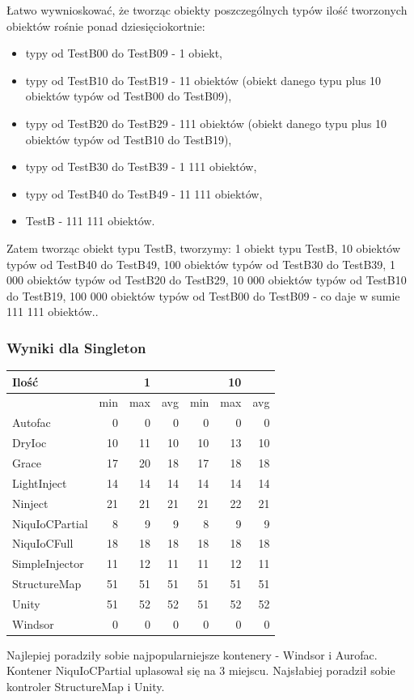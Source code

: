 \documentclass[12pt]{article}
\begin{document}
Łatwo wywnioskować, że tworząc obiekty poszczególnych typów ilość tworzonych obiektów rośnie ponad dziesięciokortnie:
\begin{itemize}
	\item typy od TestB00 do TestB09 - 1 obiekt,
	\item typy od TestB10 do TestB19 - 11 obiektów (obiekt danego typu plus 10 obiektów typów od TestB00 do TestB09),
	\item typy od TestB20 do TestB29 - 111 obiektów (obiekt danego typu plus 10 obiektów typów od TestB10 do TestB19),
	\item typy od TestB30 do TestB39 - 1 111 obiektów,
	\item  typy od TestB40 do TestB49 - 11 111 obiektów,
	\item TestB - 111 111 obiektów.
\end{itemize}
Zatem tworząc obiekt typu TestB, tworzymy: 1 obiekt typu TestB, 10 obiektów typów od TestB40 do TestB49, 100 obiektów typów od TestB30 do TestB39, 1 000 obiektów typów od TestB20 do TestB29, 10 000 obiektów typów od TestB10 do TestB19, 100 000 obiektów typów od TestB00 do TestB09 - co daje w sumie 111 111 obiektów..

\subsubsection{Wyniki dla Singleton}
\begin{center}
\begin{small}
	\begin{tabular}{ | l | r r r | r r r | }
    		\hline
     		Ilość & & 1 & & & 10 &  \\ \hline
     		 & min & max & avg & min & max & avg \\ \hline
		Autofac & 0 & 0 & 0 & 0 & 0 & 0 \\ \hline
		DryIoc & 10 & 11 & 10 & 10 & 13 & 10 \\ \hline
		Grace & 17 & 20 & 18 & 17 & 18 & 18 \\ \hline
		LightInject & 14 & 14 & 14 & 14 & 14 & 14 \\ \hline
		Ninject & 21 & 21 & 21 & 21 & 22 & 21 \\ \hline
		NiquIoCPartial & 8 & 9 & 9 & 8 & 9 & 9 \\ \hline
		NiquIoCFull & 18 & 18 & 18 & 18 & 18 & 18 \\ \hline
		SimpleInjector & 11 & 12 & 11 & 11 & 12 & 11 \\ \hline
		StructureMap & 51 & 51 & 51 & 51 & 51 & 51 \\ \hline
		Unity & 51 & 52 & 52 & 51 & 52 & 52 \\ \hline
		Windsor & 0 & 0 & 0 & 0 & 0 & 0 \\
    		\hline
  	\end{tabular}
\end{small}
\end{center}
Najlepiej poradziły sobie najpopularniejsze kontenery - Windsor i Aurofac. Kontener NiquIoCPartial uplasował się na 3 miejscu. Najsłabiej poradził sobie kontroler StructureMap i Unity.
\end{document}
